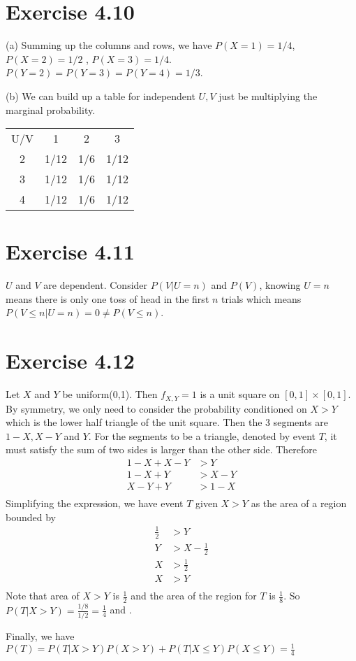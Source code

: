 \documentclass[12pt]{article}
\begin{document}
\section*{Exercise 4.10}
(a) Summing up the columns and rows, we have $P(X=1) = 1/4$, $P(X=2)=1/2$ , $P(X=3)=1/4$. 
$P(Y=2)= P(Y=3) = P(Y=4) = 1/3$. 

(b) We can build up a table for independent $U,V$ just be multiplying the marginal probability.
\begin{center}
\begin{tabular}{ |c|ccc| } 
\hline
U/V & 1& 2&  3 \\
2 & 1/12 & 1/6 & 1/12 \\ 
3 & 1/12 & 1/6 & 1/12 \\ 
4 & 1/12 & 1/6 & 1/12 \\ 
\hline
\end{tabular}
\end{center}

\section*{Exercise 4.11}
$U$ and $V$ are dependent. Consider $P(V|U=n)$ and $P(V)$, knowing $U=n$ means there is only one toss of head in the first $n$ trials which means $P(V \leq n | U = n) = 0 \neq P(V \leq n)$.

\section*{Exercise 4.12}
Let $X$ and $Y$ be uniform(0,1). Then $f_{X,Y} = 1$ is a unit square on $[0,1]\times[0,1]$. By symmetry, we only need to consider the probability conditioned on $X > Y$ which is the lower half triangle of the unit square. Then the 3 segments are $1 - X, X - Y$ and $Y$. For the segments to be a triangle, denoted by event $T$, it must satisfy the sum of two sides is larger than the other side. Therefore
$$\begin{aligned}
 1 - X + X - Y &> Y \\
 1 - X + Y &> X - Y  \\
 X - Y + Y &> 1 - X \\
\end{aligned}$$
Simplifying the expression, we have event $T$ given $X > Y$ as the area of a region bounded by 
$$\begin{aligned}
 \frac{1}{2} &> Y \\
 Y &> X - \frac{1}{2}  \\
 X &> \frac{1}{2} \\
 X &> Y \\
\end{aligned}$$
Note that area of $X > Y$ is $\frac{1}{2}$ and the area of the region for $T$ is $\frac{1}{8}$.  So $P(T | X > Y)  = \frac{1/8}{1/2} = \frac{1}{4}$ and .

Finally, we have $P(T) = P(T | X > Y) P(X > Y) + P(T | X \leq Y) P( X \leq Y) = \frac{1}{4}$
\end{document}
